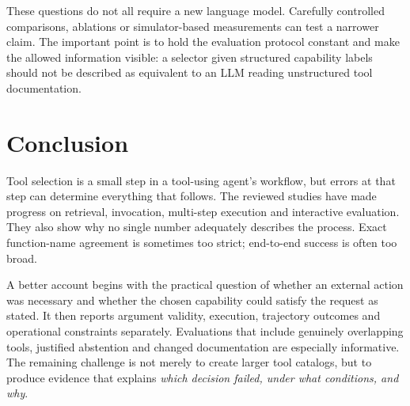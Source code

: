 \documentclass[10pt,a4paper]{article}
\begin{document}
These questions do not all require a new language model. Carefully controlled comparisons, ablations or simulator-based measurements can test a narrower claim. The important point is to hold the evaluation protocol constant and make the allowed information visible: a selector given structured capability labels should not be described as equivalent to an LLM reading unstructured tool documentation.

\section{Conclusion}
Tool selection is a small step in a tool-using agent's workflow, but errors at that step can determine everything that follows. The reviewed studies have made progress on retrieval, invocation, multi-step execution and interactive evaluation. They also show why no single number adequately describes the process. Exact function-name agreement is sometimes too strict; end-to-end success is often too broad.

A better account begins with the practical question of whether an external action was necessary and whether the chosen capability could satisfy the request as stated. It then reports argument validity, execution, trajectory outcomes and operational constraints separately. Evaluations that include genuinely overlapping tools, justified abstention and changed documentation are especially informative. The remaining challenge is not merely to create larger tool catalogs, but to produce evidence that explains \emph{which decision failed, under what conditions, and why}.
\end{document}
